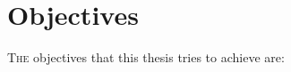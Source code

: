 \section{Objectives} %
\label{sec:intro:motivation}




\lettrine{T}{he} objectives that this thesis tries to achieve are:

